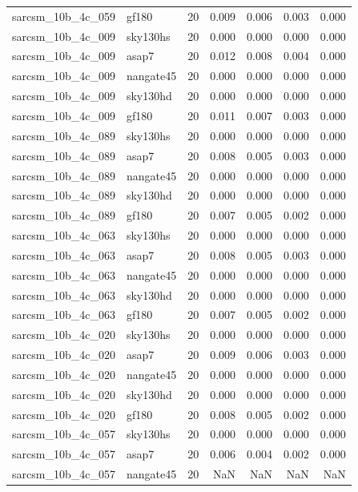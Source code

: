 \begin{tabular}{llrrrrr}
sarcsm\_10b\_4c\_059 & gf180 & 20 & 0.009 & 0.006 & 0.003 & 0.000 \\
sarcsm\_10b\_4c\_009 & sky130hs & 20 & 0.000 & 0.000 & 0.000 & 0.000 \\
sarcsm\_10b\_4c\_009 & asap7 & 20 & 0.012 & 0.008 & 0.004 & 0.000 \\
sarcsm\_10b\_4c\_009 & nangate45 & 20 & 0.000 & 0.000 & 0.000 & 0.000 \\
sarcsm\_10b\_4c\_009 & sky130hd & 20 & 0.000 & 0.000 & 0.000 & 0.000 \\
sarcsm\_10b\_4c\_009 & gf180 & 20 & 0.011 & 0.007 & 0.003 & 0.000 \\
sarcsm\_10b\_4c\_089 & sky130hs & 20 & 0.000 & 0.000 & 0.000 & 0.000 \\
sarcsm\_10b\_4c\_089 & asap7 & 20 & 0.008 & 0.005 & 0.003 & 0.000 \\
sarcsm\_10b\_4c\_089 & nangate45 & 20 & 0.000 & 0.000 & 0.000 & 0.000 \\
sarcsm\_10b\_4c\_089 & sky130hd & 20 & 0.000 & 0.000 & 0.000 & 0.000 \\
sarcsm\_10b\_4c\_089 & gf180 & 20 & 0.007 & 0.005 & 0.002 & 0.000 \\
sarcsm\_10b\_4c\_063 & sky130hs & 20 & 0.000 & 0.000 & 0.000 & 0.000 \\
sarcsm\_10b\_4c\_063 & asap7 & 20 & 0.008 & 0.005 & 0.003 & 0.000 \\
sarcsm\_10b\_4c\_063 & nangate45 & 20 & 0.000 & 0.000 & 0.000 & 0.000 \\
sarcsm\_10b\_4c\_063 & sky130hd & 20 & 0.000 & 0.000 & 0.000 & 0.000 \\
sarcsm\_10b\_4c\_063 & gf180 & 20 & 0.007 & 0.005 & 0.002 & 0.000 \\
sarcsm\_10b\_4c\_020 & sky130hs & 20 & 0.000 & 0.000 & 0.000 & 0.000 \\
sarcsm\_10b\_4c\_020 & asap7 & 20 & 0.009 & 0.006 & 0.003 & 0.000 \\
sarcsm\_10b\_4c\_020 & nangate45 & 20 & 0.000 & 0.000 & 0.000 & 0.000 \\
sarcsm\_10b\_4c\_020 & sky130hd & 20 & 0.000 & 0.000 & 0.000 & 0.000 \\
sarcsm\_10b\_4c\_020 & gf180 & 20 & 0.008 & 0.005 & 0.002 & 0.000 \\
sarcsm\_10b\_4c\_057 & sky130hs & 20 & 0.000 & 0.000 & 0.000 & 0.000 \\
sarcsm\_10b\_4c\_057 & asap7 & 20 & 0.006 & 0.004 & 0.002 & 0.000 \\
sarcsm\_10b\_4c\_057 & nangate45 & 20 & NaN & NaN & NaN & NaN \\

\end{tabular}
